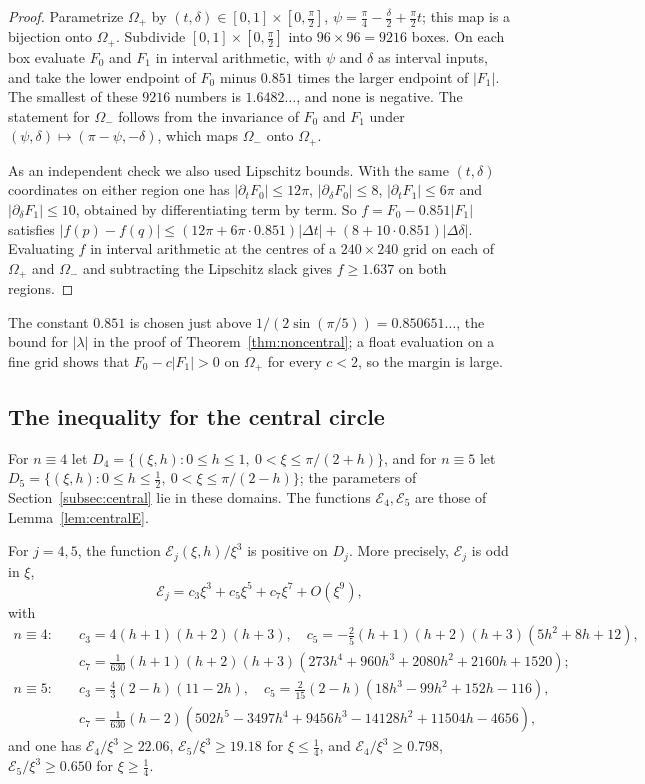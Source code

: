 \begin{proof}
Parametrize $\Omega_+$ by $(t,\delta)\in[0,1]\times[0,\frac\pi2]$, $\psi=\frac\pi4-\frac\delta2+\frac\pi2t$; this map is a bijection onto $\Omega_+$.
Subdivide $[0,1]\times[0,\frac\pi2]$ into $96\times96=9216$ boxes. On each box evaluate $F_0$ and $F_1$ in interval
arithmetic, with $\psi$ and $\delta$ as interval inputs, and take the lower endpoint of $F_0$ minus $0.851$ times the
larger endpoint of $|F_1|$. The smallest of these $9216$ numbers is $1.6482\ldots$, and none is negative. The
statement for $\Omega_-$ follows from the invariance of $F_0$ and $F_1$ under $(\psi,\delta)\mapsto(\pi-\psi,-\delta)$, which maps
$\Omega_-$ onto $\Omega_+$.

As an independent check we also used Lipschitz bounds. With the same $(t,\delta)$ coordinates on either region one has
$|\partial_tF_0|\le12\pi$, $|\partial_\delta F_0|\le8$, $|\partial_tF_1|\le6\pi$ and $|\partial_\delta F_1|\le10$, obtained by differentiating term by
term. So $f=F_0-0.851|F_1|$ satisfies $|f(p)-f(q)|\le(12\pi+6\pi\cdot0.851)|\Delta t|+(8+10\cdot0.851)|\Delta\delta|$. Evaluating $f$ in
interval arithmetic at the centres of a $240\times240$ grid on each of $\Omega_+$ and $\Omega_-$ and subtracting the Lipschitz
slack gives $f\ge1.637$ on both regions.
\end{proof}

The constant $0.851$ is chosen just above $1/(2\sin(\pi/5))=0.850651\ldots$, the bound for $|\lambda|$ in the proof of
Theorem~\ref{thm:noncentral}; a float evaluation on a fine grid shows that $F_0-c|F_1|>0$ on $\Omega_+$ for every $c<2$, so the
margin is large.

\subsection{The inequality for the central circle}

For $n\equiv4$ let $D_4=\{(\xi,h):0\le h\le1,\ 0<\xi\le\pi/(2+h)\}$, and for $n\equiv5$ let
$D_5=\{(\xi,h):0\le h\le\frac12,\ 0<\xi\le\pi/(2-h)\}$; the parameters of Section~\ref{subsec:central} lie in these domains.
The functions $\mathcal E_4,\mathcal E_5$ are those of Lemma~\ref{lem:centralE}.

\begin{lemma}\label{lem:ineqB}
For $j=4,5$, the function $\mathcal E_j(\xi,h)/\xi^3$ is positive on $D_j$. More precisely, $\mathcal E_j$ is odd in $\xi$,
\[
\mathcal E_j=c_3\xi^3+c_5\xi^5+c_7\xi^7+O(\xi^9),
\]
with
\begin{align*}
n\equiv4:\quad& c_3=4(h+1)(h+2)(h+3),\quad c_5=-\tfrac25(h+1)(h+2)(h+3)(5h^2+8h+12),\\
& c_7=\tfrac1{630}(h+1)(h+2)(h+3)(273h^4+960h^3+2080h^2+2160h+1520);\\
n\equiv5:\quad& c_3=\tfrac43(2-h)(11-2h),\quad c_5=\tfrac2{15}(2-h)(18h^3-99h^2+152h-116),\\
& c_7=\tfrac1{630}(h-2)(502h^5-3497h^4+9456h^3-14128h^2+11504h-4656),
\end{align*}
and one has $\mathcal E_4/\xi^3\ge22.06$, $\mathcal E_5/\xi^3\ge19.18$ for $\xi\le\frac14$, and $\mathcal E_4/\xi^3\ge0.798$, $\mathcal E_5/\xi^3\ge0.650$ for
$\xi\ge\frac14$.
\end{lemma}


